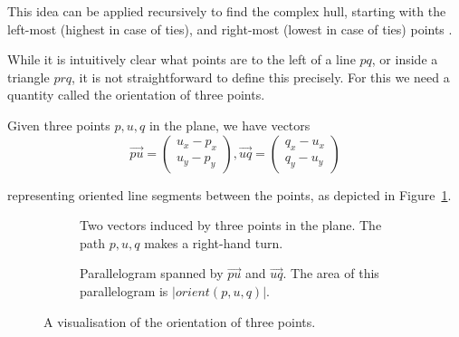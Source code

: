This idea can be applied recursively to find the complex hull, starting with
the left-most (highest in case of ties), and right-most (lowest in case of ties)
points \cite{Barber96}.

While it is intuitively clear what points are to the left of a line $pq$, or
inside a triangle $prq$, it is not straightforward to define this precisely.
For this we need a quantity called the orientation of three points.

Given three points $p, u, q$ in the plane, we have vectors
\[
    \vec{pu} = \begin{pmatrix}
        u_x - p_x \\
        u_y - p_y
    \end{pmatrix},
    \vec{uq} = \begin{pmatrix}
        q_x - u_x \\
        q_y - u_y
    \end{pmatrix}
\]

representing oriented line segments between the points, as depicted in
Figure~\ref{fig:orient1}.

\begin{figure}[ht]
    \begin{subfigure}{0.45\textwidth}
    \caption{Two vectors induced by three points in the plane. The path 
             $p, u, q$ makes a right-hand turn.}
    \label{fig:orient1}
    \end{subfigure}\hfill
    \begin{subfigure}{0.45\textwidth}
    \caption{Parallelogram spanned by $\vec{pu}$ and $\vec{uq}$. 
             The area of this parallelogram is $|orient(p, u, q)|$.}
    \label{fig:orient2}
    \end{subfigure}
    \caption{A visualisation of the orientation of three points.}
\end{figure}


